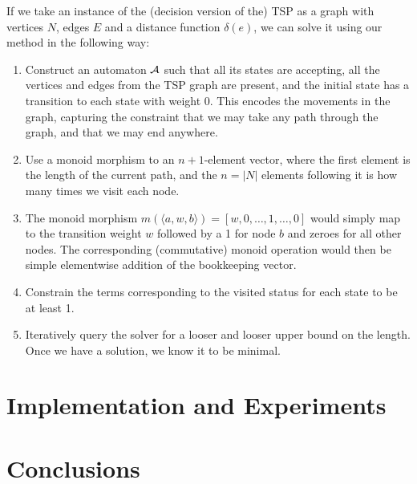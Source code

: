 \documentclass[runningheads]{llncs}
\newif\ifoutline
\newcommand{\contents}[1]{\ifoutline{\color{blue}
    \begin{itemize}
    #1
    \end{itemize}
  }\fi}
\begin{document}
If we take an instance of the (decision version of the) TSP as a graph with vertices $N$, edges $E$ and a distance function $\delta(e)$, we can solve it using our method in the following way:
\begin{enumerate}
  \item Construct an automaton $\mathcal{A}$ such that all its states are accepting, all the vertices and edges from the TSP graph are present, and the initial state has a transition to each state with weight 0. This encodes the movements in the graph, capturing the constraint that we may take any path through the graph, and that we may end anywhere.
  \item Use a monoid morphism to an $n +1$-element vector, where the first element is the length of the current path, and the $n = |N|$ elements following it is how many times we visit each node.
  \item The monoid morphism $m(\langle a, w, b\rangle) = \left[w, 0, \ldots, 1, \ldots, 0 \right] $ would simply map to the transition weight $w$ followed by a 1 for node $b$ and zeroes for all other nodes. The corresponding (commutative) monoid operation would then be simple elementwise addition of the bookkeeping vector.
  \item Constrain the terms corresponding to the visited status for each state to be at least 1.
  \item Iteratively query the solver for a looser and looser upper bound on the length. Once we have a solution, we know it to be minimal.
\end{enumerate}

\section{Implementation and Experiments}


\contents{
\item length constraints
\item Parikh automata, automata with registers
\item Model-checking examples
}

\section{Conclusions}

\clearpage
%
\printbibliography
\end{document}
